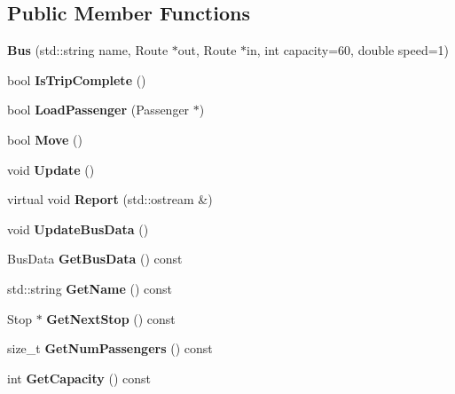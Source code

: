 \subsection*{Public Member Functions}
\begin{DoxyCompactItemize}
\item 
\mbox{\label{classBus_aa28c3c318b6993f3a3aebf211daa9217}} 
{\bfseries Bus} (std\+::string name, Route $\ast$out, Route $\ast$in, int capacity=60, double speed=1)
\item 
\mbox{\label{classBus_a9c64b0801bf589f121fb0598b70a99b4}} 
bool {\bfseries Is\+Trip\+Complete} ()
\item 
\mbox{\label{classBus_ac3f1c523bc4f97bc8ada8dc488ab3484}} 
bool {\bfseries Load\+Passenger} (Passenger $\ast$)
\item 
\mbox{\label{classBus_a5e667186d6db0916ebab0e4eff3312c8}} 
bool {\bfseries Move} ()
\item 
\mbox{\label{classBus_a9896f74f16966f7621d0dfafff0ec6b4}} 
void {\bfseries Update} ()
\item 
\mbox{\label{classBus_af0a1aaa0e167b865a66c0fe0be9a3220}} 
virtual void {\bfseries Report} (std\+::ostream \&)
\item 
\mbox{\label{classBus_a38b7ee7b13b3438894e914a6933a6f44}} 
void {\bfseries Update\+Bus\+Data} ()
\item 
\mbox{\label{classBus_aee8d077fc426b73942dec2564b5d066a}} 
Bus\+Data {\bfseries Get\+Bus\+Data} () const
\item 
\mbox{\label{classBus_a2143b0563ad48b1b67e114d1ba5342ca}} 
std\+::string {\bfseries Get\+Name} () const
\item 
\mbox{\label{classBus_a6068e9801c6da152f05e40eb26e80b02}} 
Stop $\ast$ {\bfseries Get\+Next\+Stop} () const
\item 
\mbox{\label{classBus_a346aaa56030d4707886e1db8181e8b55}} 
size\+\_\+t {\bfseries Get\+Num\+Passengers} () const
\item 
\mbox{\label{classBus_a3a1f68e9e2548f981d0150901918922c}} 
int {\bfseries Get\+Capacity} () const
\end{DoxyCompactItemize}


